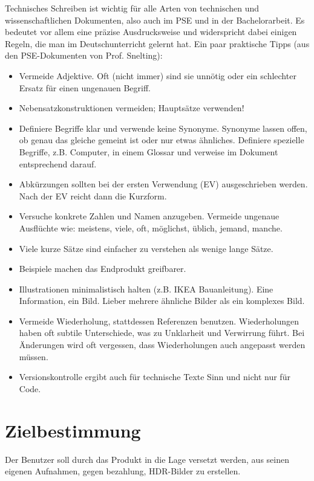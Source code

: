 \documentclass[parskip=full]{scrartcl}
\begin{document}
Technisches Schreiben ist wichtig für alle Arten von technischen und wissenschaftlichen Dokumenten, also auch im PSE und in der Bachelorarbeit.
Es bedeutet vor allem eine präzise Ausdrucksweise und widerspricht dabei einigen Regeln, die man im Deutschunterricht gelernt hat.
Ein paar praktische Tipps (aus den PSE-Dokumenten von Prof. Snelting):
\begin{itemize}[nosep]
\item Vermeide Adjektive.
      Oft (nicht immer) sind sie unnötig oder ein schlechter Ersatz für einen ungenauen Begriff.
\item Nebensatzkonstruktionen vermeiden; Hauptsätze verwenden!
\item Definiere Begriffe klar und verwende keine Synonyme.
      Synonyme lassen offen, ob genau das gleiche gemeint ist oder nur etwas ähnliches.
      Definiere spezielle Begriffe, z.B. \gls{Computer}, in einem Glossar und verweise im Dokument entsprechend darauf.
\item Abkürzungen sollten bei der ersten Verwendung (EV) ausgeschrieben werden.
      Nach der EV reicht dann die Kurzform.
\item Versuche konkrete Zahlen und Namen anzugeben.
      Vermeide ungenaue Ausflüchte wie: meistens, viele, oft, möglichst, üblich, jemand, manche.
\item Viele kurze Sätze sind einfacher zu verstehen als wenige lange Sätze.
\item Beispiele machen das Endprodukt greifbarer.
\item Illustrationen minimalistisch halten (z.B. IKEA Bauanleitung).
      Eine Information, ein Bild.
      Lieber mehrere ähnliche Bilder als ein komplexes Bild.
\item Vermeide Wiederholung, stattdessen Referenzen benutzen.
      Wiederholungen haben oft subtile Unterschiede, was zu Unklarheit und Verwirrung führt.
      Bei Änderungen wird oft vergessen, dass Wiederholungen auch angepasst werden müssen.
\item Versionskontrolle ergibt auch für technische Texte Sinn und nicht nur für Code.
\end{itemize}

%
%
\section{Zielbestimmung}
Der Benutzer soll durch das Produkt in die Lage versetzt werden, aus seinen eigenen Aufnahmen, gegen bezahlung, HDR-Bilder zu erstellen.
\end{document}
